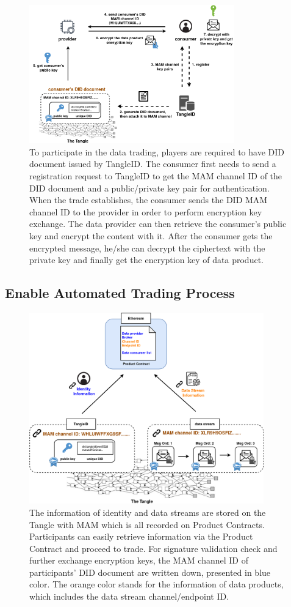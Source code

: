 \documentclass[conference]{IEEEtran}
\begin{document}
\begin{figure}[h]
    \centering
    \includegraphics[width=3.5in]{TangleID}
    \caption{To participate in the data trading, players are required to have DID document issued by TangleID. The consumer first needs to send a registration request to TangleID to get the MAM channel ID of the DID document and a public/private key pair for authentication. When the trade establishes, the consumer sends the DID MAM channel ID to the provider in order to perform encryption key exchange. The data provider can then retrieve the consumer's public key and encrypt the content with it. After the consumer gets the encrypted message, he/she can decrypt the ciphertext with the private key and finally get the encryption key of data product.}
    \label{fig:TangleID}
\end{figure}


\subsection{Enable Automated Trading Process}
\begin{figure}[t]
    \centering
    \includegraphics[width=4in]{smart_contract_mam}
    \caption{The information of identity and data streams are stored on the Tangle with MAM which is all recorded on Product Contracts. Participants can easily retrieve information via the Product Contract and proceed to trade. For signature validation check and further exchange encryption keys, the MAM channel ID of participants' DID document are written down, presented in blue color. The orange color stands for the information of data products, which includes the data stream channel/endpoint ID.}
    \label{fig:smart_contract_mam}
\end{figure}
\end{document}
